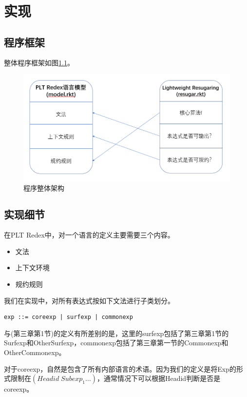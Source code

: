\pagestyle{fancy}
\normalsize
\linespread{1.5}\selectfont
\label{mark:chapter5}\chapter{实现}

\section{程序框架}
整体程序框架如图\ref{fig:struct}。

\begin{figure}[h]
	\centering
	\includegraphics[width=12cm]{images/chapter5/structure.png}
	\caption{程序整体架构}
	\label{fig:struct}
\end{figure}

\section{实现细节}
在PLT Redex中，对一个语言的定义主要需要三个内容。
\begin{itemize}
	\item 文法
	\item 上下文环境
	\item 规约规则
\end{itemize}

我们在实现中，对所有表达式按如下文法进行子类划分。
\begin{verbatim}
exp ::= coreexp | surfexp | commonexp
\end{verbatim}

与(第三章第1节)的定义有所差别的是，这里的surfexp包括了第三章第1节的Surfexp和OtherSurfexp，commonexp包括了第三章第一节的Commonexp和OtherCommonexp。

对于coreexp，自然是包含了所有内部语言的术语。因为我们的定义是将Exp的形式限制在$(Headid\;Subexp_{1}\ldots)$，通常情况下可以根据Headid判断是否是coreexp。

